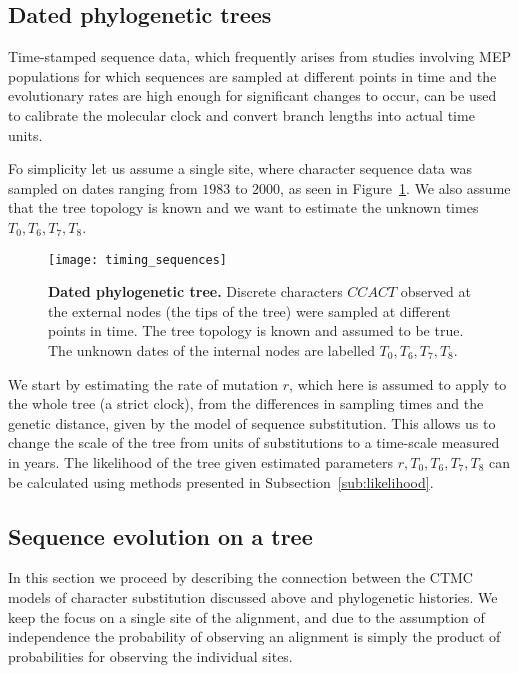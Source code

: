 \subsection{Dated phylogenetic trees\label{sub:dated_trees}}

Time-stamped sequence data, which frequently arises from studies involving MEP populations for which sequences are sampled at different points in time and the evolutionary rates are high enough for significant changes to occur, can be used to calibrate the molecular clock and convert branch lengths into actual time units.

Fo simplicity let us assume a single site, where character sequence data was sampled on dates ranging from $1983$ to $2000$, as seen in Figure~\ref{fig:timing_sequences}.
We also assume that the tree topology is known and we want to estimate the unknown times $T_{0},T_{6},T_{7},T_{8}$.

\begin{figure}[h!]
\centering
\texttt{[image: timing\_sequences]} 
\caption{
{ \footnotesize 
{\bf Dated phylogenetic tree.} 
Discrete characters $CCACT$ observed at the external nodes (the tips of the tree) were sampled at different points in time.
The tree topology is known and assumed to be true.
The unknown dates of the internal nodes are labelled $T_{0},T_{6},T_{7},T_{8}$.
}%
}
\label{fig:timing_sequences}
\end{figure}

We start by estimating the rate of mutation $r$, which here is assumed to apply to the whole tree (a strict clock), from the differences in sampling times and the genetic distance, given by the model of sequence substitution.
This allows us to change the scale of the tree from units of substitutions to a time-scale measured in years.
The likelihood of the tree given estimated parameters $r,T_{0},T_{6},T_{7},T_{8}$ can be calculated using methods presented in Subsection~\ref{sub:likelihood}.


\subsection{Sequence evolution on a tree\label{sub:evolutionOnTree}}

In this section we proceed by describing the connection between the CTMC models of character substitution discussed above and phylogenetic histories.
We keep the focus on a single site of the alignment, and due to the assumption of independence the probability of observing an alignment is simply the product of probabilities for observing the individual sites.

